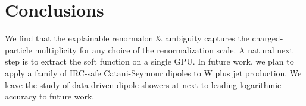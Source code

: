 \section{Conclusions}\label{sec:conclusions}

We find that the explainable renormalon & ambiguity captures the
charged-particle multiplicity for any choice of the renormalization
scale. A natural next step is to extract the soft function on a single
GPU. In future work, we plan to apply a family of IRC-safe
Catani-Seymour dipoles to W plus jet production. We leave the study of
data-driven dipole showers at next-to-leading logarithmic accuracy to
future work.

